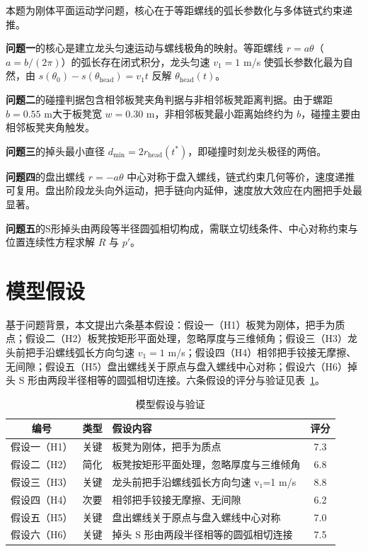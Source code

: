 \documentclass[12pt,a4paper]{article}
\begin{document}
本题为刚体平面运动学问题，核心在于等距螺线的弧长参数化与多体链式约束递推。

\textbf{问题一}的核心是建立龙头匀速运动与螺线极角的映射。等距螺线 $r=a\theta$（$a=b/(2\pi)$）的弧长存在闭式积分，龙头匀速 $v_1=1$ m/s 使弧长参数化最为自然，由 $s(\theta_0)-s(\theta_{\text{head}})=v_1 t$ 反解 $\theta_{\text{head}}(t)$。

\textbf{问题二}的碰撞判据包含相邻板凳夹角判据与非相邻板凳距离判据。由于螺距 $b=0.55$ m大于板凳宽 $w=0.30$ m，非相邻板凳最小距离始终约为 $b$，碰撞主要由相邻板凳夹角触发。

\textbf{问题三}的掉头最小直径 $d_{\min}=2r_{\text{head}}(t^*)$，即碰撞时刻龙头极径的两倍。

\textbf{问题四}的盘出螺线 $r=-a\theta$ 中心对称于盘入螺线，链式约束几何等价，速度递推可复用。盘出阶段龙头向外运动，把手链向内延伸，速度放大效应在内圈把手处最显著。

\textbf{问题五}的S形掉头由两段等半径圆弧相切构成，需联立切线条件、中心对称约束与位置连续性方程求解 $R$ 与 $p'$。

\section{模型假设}

基于问题背景，本文提出六条基本假设：假设一（H1）板凳为刚体，把手为质点；假设二（H2）板凳按矩形平面处理，忽略厚度与三维倾角；假设三（H3）龙头前把手沿螺线弧长方向匀速 $v_1=1$ m/s；假设四（H4）相邻把手铰接无摩擦、无间隙；假设五（H5）盘出螺线关于原点与盘入螺线中心对称；假设六（H6）掉头 S 形由两段半径相等的圆弧相切连接。六条假设的评分与验证见表~\ref{tab:assump}。

\begin{table}[htbp]
\centering
\caption{模型假设与验证}\label{tab:assump}
\begin{tabular}{clp{6cm}c}
\toprule
编号 & 类型 & 假设内容 & 评分 \\
\midrule
假设一（H1） & 关键 & 板凳为刚体，把手为质点 & 7.3 \\
假设二（H2） & 简化 & 板凳按矩形平面处理，忽略厚度与三维倾角 & 6.8 \\
假设三（H3） & 关键 & 龙头前把手沿螺线弧长方向匀速 v₁=1 m/s & 8.8 \\
假设四（H4） & 次要 & 相邻把手铰接无摩擦、无间隙 & 6.2 \\
假设五（H5） & 关键 & 盘出螺线关于原点与盘入螺线中心对称 & 7.0 \\
假设六（H6） & 关键 & 掉头 S 形由两段半径相等的圆弧相切连接 & 7.5 \\
\bottomrule
\end{tabular}
\end{table}
\end{document}
